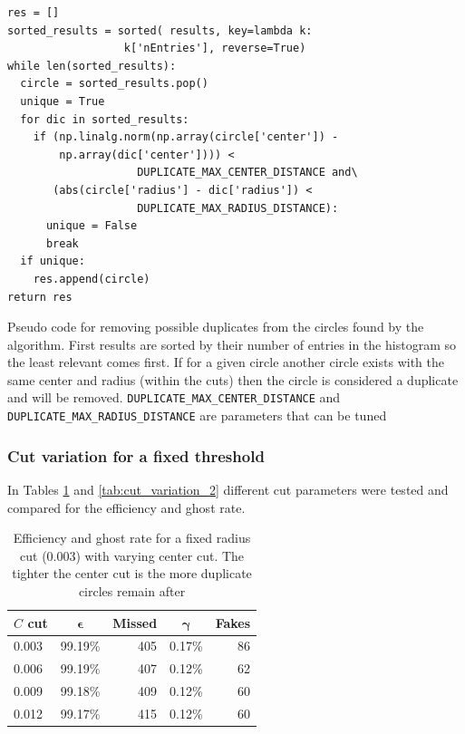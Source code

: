 \documentclass[11pt]{scrreprt}
\begin{document}
\begin{codesnippet}[htb]
\centering
  \begin{lstlisting}
res = []
sorted_results = sorted( results, key=lambda k: 
                  k['nEntries'], reverse=True)
while len(sorted_results):
  circle = sorted_results.pop()
  unique = True
  for dic in sorted_results:
    if (np.linalg.norm(np.array(circle['center']) - 
        np.array(dic['center']))) < 
                    DUPLICATE_MAX_CENTER_DISTANCE and\
       (abs(circle['radius'] - dic['radius']) < 
                    DUPLICATE_MAX_RADIUS_DISTANCE):
      unique = False
      break
  if unique:
    res.append(circle)
return res
\end{lstlisting}
\caption[Pseudo code for removing possible duplicates]{Pseudo code for removing possible duplicates from the circles found by the algorithm. First results are sorted by their number of entries
in the histogram so the least relevant comes first. If for a given circle another circle exists with the same center and radius (within the cuts)
then the circle is considered a duplicate and will be removed. \texttt{DUPLICATE\_MAX\_CENTER\_DISTANCE} and \texttt{DUPLICATE\_MAX\_RADIUS\_DISTANCE} are 
parameters that can be tuned}\label{pc:dup_code}
\end{codesnippet}

\subsubsection{Cut variation for a fixed threshold} %
\label{ssub:cut_variation_for_a_fixed_threshold}
In Tables \ref{tab:cut_variation_1} and \ref{tab:cut_variation_2} different cut parameters were tested
and compared for the efficiency and ghost rate.

\begin{table}[htbp]
  \caption{Efficiency and ghost rate for a fixed radius cut (0.003) with varying center cut. The tighter the center cut is
  the more duplicate circles remain after }
  \label{tab:cut_variation_1}
  \centering

  \begin{tabular}{lcrcr}
  \toprule
  \textbf{$C$ cut} & $\boldsymbol{\epsilon}$ & \textbf{Missed} & $\boldsymbol{\gamma}$ & \textbf{Fakes} \\
  \midrule
  0.003 & 99.19\% & 405 & 0.17\% & 86 \\
  0.006 & 99.19\% & 407 & 0.12\% & 62 \\
  0.009 & 99.18\% & 409 & 0.12\% & 60 \\
  0.012 & 99.17\% & 415 & 0.12\% & 60 \\
    \bottomrule
  \end{tabular}
\end{table}
\end{document}
